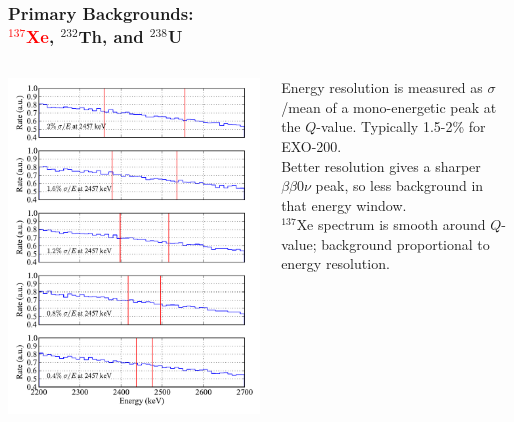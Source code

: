 \documentclass{beamer}
\begin{document}
\begin{frame}
\begin{center}
\frametitle{\hfill Primary Backgrounds:\\\hfill \textcolor{red}{$^{137}$Xe}, $^{232}$Th, and $^{238}$U}
\end{center}
\begin{columns}
\begin{column}{.6\textwidth}
\includegraphics[keepaspectratio=true,width=\textwidth]{Xe_Spectra_vs_Res.pdf}
\end{column}
\begin{column}{.4\textwidth}
\vspace{.5cm}

Energy resolution is measured as $\sigma$/mean of a mono-energetic peak at the $Q$-value.  Typically 1.5-2\% for EXO-200.\\[\baselineskip]

Better resolution gives a sharper $\beta\beta 0\nu$ peak, so less background in that energy window.\\[\baselineskip]

$^{137}$Xe spectrum is smooth around $Q$-value; background proportional to energy resolution.
\end{column}
\end{columns}
\end{frame}
\end{document}
